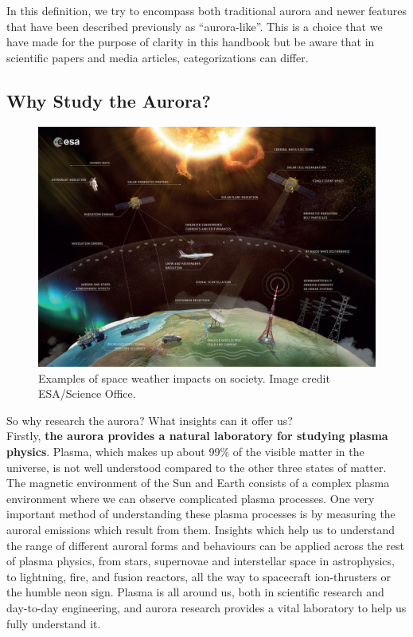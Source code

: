 \documentclass{article}
\newcommand{\contributed}[1]{%
    \par\noindent
    \begingroup
    \setlength{\leftskip}{1em}%
    \itshape
    Contributors: #1
    \par
    \endgroup
    \vspace{0.5em}
}
\begin{document}
In this definition, we try to encompass both traditional aurora and newer features that have been described previously as ``aurora-like''. This is a choice that we have made for the purpose of clarity in this handbook but be aware that in scientific papers and media articles, categorizations can differ.




\subsection{Why Study the Aurora?}

\begin{figure}[h!]
  \includegraphics[width=\linewidth]{Fig2_SpaceWeather.jpg}
  \caption{Examples of space weather impacts on society. Image credit ESA/Science Office.}
  \label{space-weather}
  
\end{figure}

So why research the aurora? What insights can it offer us?\\
Firstly, \textbf{the aurora provides a natural laboratory for studying plasma physics}. Plasma, which makes up about 99\% of the visible matter in the universe, is not well understood compared to the other three states of matter. The magnetic environment of the Sun and Earth consists of a complex plasma environment where we can observe complicated plasma processes. One very important method of understanding these plasma processes is by measuring the auroral emissions which result from them. Insights which help us to understand the range of different auroral forms and behaviours can be applied across the rest of plasma physics, from stars, supernovae and interstellar space in astrophysics, to lightning, fire, and fusion reactors, all the way to spacecraft ion-thrusters or the humble neon sign. Plasma is all around us, both in scientific research and day-to-day engineering, and aurora research provides a vital laboratory to help us fully understand it.
\end{document}
